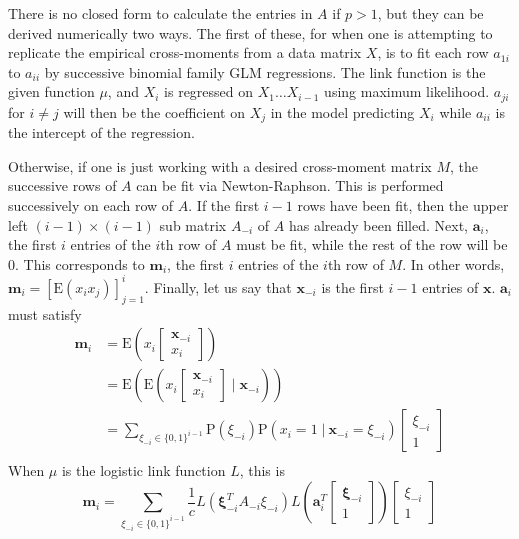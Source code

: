 \documentclass[11pt]{article}
\newcommand{\p}{\mathrm{P}}
\newcommand{\E}{\mathrm{E}}
\newcommand{\st}{ \; \big | \:}
\theoremstyle{definition}
\begin{document}
    There is no closed form to calculate the entries in $A$ if $p>1$, but they can be derived numerically two ways. The first of these, for when one is attempting to replicate the empirical cross-moments from a data matrix $X$, is to fit each row $a_{1i}$ to $a_{ii}$ by successive binomial family GLM regressions. The link function is the given function $\mu$, and $X_i$ is regressed on $X_{1} \ldots X_{i-1}$ using maximum likelihood. $a_{ji}$ for $i\neq j$ will then be the coefficient on $X_j$ in the model predicting $X_i$ while $a_{ii}$ is the intercept of the regression. \par
    Otherwise, if one is just working with a desired cross-moment matrix $M$, the successive rows of $A$ can be fit via Newton-Raphson.\cite{2011arXiv1111.0576S} This is performed successively on each row of $A$. If the first $i-1$ rows have been fit, then the upper left $(i-1)\times(i-1)$ sub matrix $A_{-i}$ of $A$ has already been filled. Next, $\mathbf a_i$, the first $i$ entries of the $i$th row of $A$ must be fit, while the rest of the row will be 0. This corresponds to $\mathbf m_i$, the first $i$ entries of the $i$th row of $M$. In other words, $\mathbf{m}_i = [\E(x_i x_j)]_{j=1}^{i}$. Finally, let us say that $\mathbf x_{-i}$ is the first $i-1$ entries of $\mathbf x$. $\mathbf a_i$ must satisfy 
            \begin{align*}
                \mathbf m_i &= \E\left(x_i \left[\begin{array}{c} \mathbf x_{-i} \\ x_i \end{array}\right]\right) \\
                 &= \E\left(\E\left(x_i \left[\begin{array}{c} \mathbf x_{-i} \\ x_i \end{array}\right]\;\bigg \vert\; \mathbf x_{-i}\right)\right)\\
                 &= \sum_{\xi_{-i} \in \{0,1\}^{i-1}} \p(\xi_{-i})\p(x_i=1\st \mathbf x_{-i}=\xi_{-i}) \left[\begin{array}{c} \xi_{-i} \\ 1 \end{array}\right] \\
            \end{align*}
            When $\mu$ is the logistic link function $L$, this is
            \[ \mathbf m_i = \sum_{\xi_{-i} \in \{0,1\}^{i-1}} \frac{1}{c}L\left(\mathbf \xi_{-i}^TA_{-i}\xi_{-i}\right) L\left(\mathbf{a}_i^T\left[\begin{array}{c} \mathbf \xi_{-i} \\ 1 \end{array}\right]\right)\left[\begin{array}{c} \xi_{-i} \\ 1 \end{array}\right] \]
\end{document}
